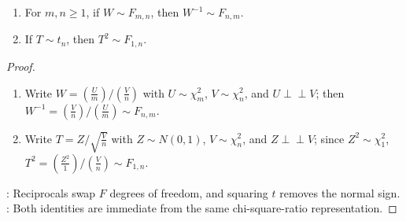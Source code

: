 \begin{corollary} \label{cor:f-reciprocal-and-squared-t} 
\begin{enumerate}[label=(\roman*)]
\setlength{\itemsep}{0pt}
\item
For $m,n\geq1$, if $W\sim F_{m,n}$, then $W^{-1}\sim F_{n,m}$.
\item
If $T\sim t_n$, then $T^2\sim F_{1,n}$.
\end{enumerate}
\begin{proof}
\begin{enumerate}[label=(\roman*)]
\setlength{\itemsep}{0pt}
\item
Write $W=(\frac{U}{m})/(\frac{V}{n})$ with $U\sim\chi_m^2$, $V\sim\chi_n^2$, and $U\perp\!\!\!\perp V$; then $W^{-1}=(\frac{V}{n})/(\frac{U}{m})\sim F_{n,m}$.
\item
Write $T=Z/\sqrt{\frac{V}{n}}$ with $Z\sim N(0,1)$, $V\sim\chi_n^2$, and $Z\perp\!\!\!\perp V$; since $Z^2\sim\chi_1^2$, $T^2=(\frac{Z^2}{1})/(\frac{V}{n})\sim F_{1,n}$.
\end{enumerate}
: Reciprocals swap $F$ degrees of freedom, and squaring $t$ removes the normal sign.\\
: Both identities are immediate from the same chi-square-ratio representation.
\end{proof}
\end{corollary}
